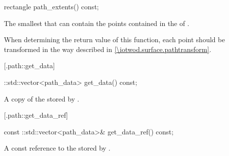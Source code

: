 %
%
\begin{itemdecl}
rectangle path_extents() const;
\end{itemdecl}
\begin{itemdescr}
	\pnum
	\returns
	The smallest  that can contain the points contained in the 
	 of .
	
	\pnum
	\remarks
	When determining the return value of this function, each point should be 
	transformed in the way described in \ref{\iotwod.surface.pathtransform}.
\end{itemdescr}

 [\iotwod.path::get_data] {}

%
%
\begin{itemdecl}
::std::vector<path_data> get_data() const;
\end{itemdecl}
\begin{itemdescr}
	\pnum
	\returns
	A copy of the  stored by .
\end{itemdescr}

 [\iotwod.path::get_data_ref] {}

%
%
\begin{itemdecl}
const ::std::vector<path_data>& get_data_ref() const;
\end{itemdecl}
\begin{itemdescr}
	\pnum
	\returns
	A const reference to the  stored by .
\end{itemdescr}
